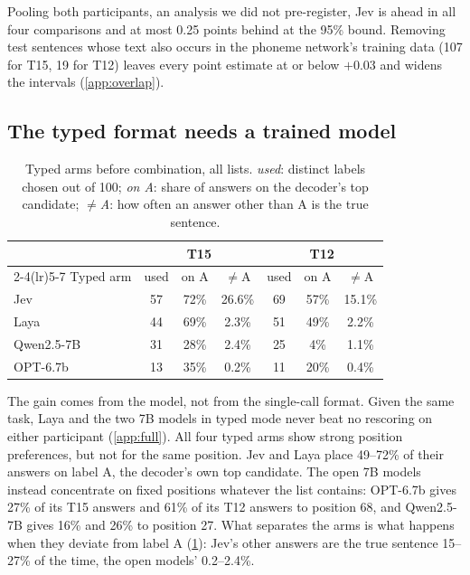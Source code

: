 \documentclass[11pt]{article}
\begin{document}
Pooling both participants, an analysis we did not pre-register, Jev is ahead in all four comparisons
and at most 0.25 points behind at the 95\% bound. Removing test sentences whose text also occurs in
the phoneme network's training data (107 for T15, 19 for T12) leaves every point estimate at or
below $+0.03$ and widens the intervals (\cref{app:overlap}).

\subsection{The typed format needs a trained model}
\label{sec:collapse}

\begin{table}[t]
\centering\small
\setlength{\tabcolsep}{3.5pt}
\begin{tabular}{lcccccc}
\toprule
& \multicolumn{3}{c}{T15} & \multicolumn{3}{c}{T12} \\
\cmidrule(lr){2-4}\cmidrule(lr){5-7}
Typed arm & used & on A & $\neq$A & used & on A & $\neq$A \\
\midrule
Jev & 57 & 72\% & 26.6\% & 69 & 57\% & 15.1\% \\
Laya & 44 & 69\% & 2.3\% & 51 & 49\% & 2.2\% \\
Qwen2.5-7B & 31 & 28\% & 2.4\% & 25 & 4\% & 1.1\% \\
OPT-6.7b & 13 & 35\% & 0.2\% & 11 & 20\% & 0.4\% \\
\bottomrule
\end{tabular}
\caption{Typed arms before combination, all lists. \emph{used}: distinct labels chosen out of 100;
\emph{on A}: share of answers on the decoder's top candidate; $\neq$\emph{A}: how often an answer
other than A is the true sentence.}
\label{tab:collapse}
\end{table}

The gain comes from the model, not from the single-call format. Given the same task, Laya and the
two 7B models in typed mode never beat no rescoring on either participant (\cref{app:full}). All four
typed arms show strong position preferences, but not for the same position. Jev and Laya place 49--72\% of
their answers on label A, the decoder's own top candidate. The open 7B models instead concentrate
on fixed positions whatever the list contains: OPT-6.7b gives 27\% of its T15 answers and 61\% of
its T12 answers to position 68, and Qwen2.5-7B gives 16\% and 26\% to position 27. What separates
the arms is what happens when they deviate from label A (\cref{tab:collapse}): Jev's other answers
are the true sentence 15--27\% of the time, the open models' 0.2--2.4\%.
\end{document}
